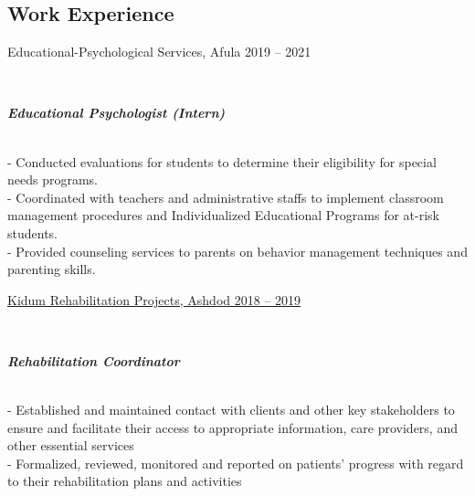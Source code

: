 \documentclass[
	11pt,a4paper %
]{article}
\newcommand{\jobentry}[5]{
	{\raggedleft\textsc{#1\expandafter\ifstrequal\expandafter{#2}{}{}{\hspace{6pt}\footnotesize{(#2)}}}\par} %
	\expandafter\ifstrequal\expandafter{#3}{}{}{{\raggedright\large #3}\\} %
	\expandafter\ifstrequal\expandafter{#4}{}{}{{\raggedright\large\textit{\textbf{#4}}}\\[4pt]} %
	\expandafter\ifstrequal\expandafter{#5}{}{}{#5} %
	\medskip %
}
\begin{document}
\begin{paracol}{2}
%
%


\section{Work Experience}





\jobentry
{} %
{} %
{Educational-Psychological Services, Afula \hfill 2019 -- 2021} %
{Educational Psychologist (Intern)} %
{
	- Conducted evaluations for students to determine their eligibility for special needs programs.
\\
	- Coordinated with teachers and administrative staffs to implement classroom management procedures and Individualized Educational Programs for at-risk students.
\\
	- Provided counseling services to parents on behavior management techniques and parenting skills.
} %

\hrulefill

\jobentry
	{} %
	{} %
	{\href{http://www.kidumpro.co.il/}{Kidum Rehabilitation Projects, Ashdod \hfill 2018 -- 2019}} %
	{Rehabilitation Coordinator} %
	{
	- Established and maintained contact with clients and other key stakeholders to ensure and facilitate their access to appropriate information, care providers, and other essential services \\
	- Formalized, reviewed, monitored and reported on patients' progress with regard to their rehabilitation plans and activities} %


\end{paracol}
\end{document}
